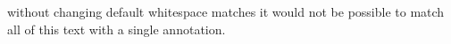 \documentclass{article}
\begin{document}
without
changing
default
whitespace 
matches 
it
would
not
be
possible
to
match
all
of
this
text
                with    a
single          annotation.
\end{document}

